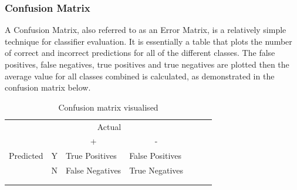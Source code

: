 \documentclass[12pt]{report}
\begin{document}
\subsubsection*{Confusion Matrix}
\begin{flushleft}
A Confusion Matrix, also referred to as an Error Matrix, is a relatively simple technique for classifier evaluation. It is essentially a table that plots the number of correct and incorrect predictions for all of the different classes. The false positives, false negatives, true positives and true negatives are plotted then the average value for all classes combined is calculated, as demonstrated in the confusion matrix below.

\begin{table}[ht!]
\begin{tabular}{lllllll}
          &                        & \multicolumn{1}{r}{Actual}           &                                      &  &  &  \\
          &                        & \multicolumn{1}{c}{+}                & \multicolumn{1}{c}{-}                &  &  &  \\ \cline{3-4}
Predicted & \multicolumn{1}{l|}{Y} & \multicolumn{1}{l|}{True Positives}  & \multicolumn{1}{l|}{False Positives} &  &  &  \\ \cline{3-4}
          & \multicolumn{1}{l|}{N} & \multicolumn{1}{l|}{False Negatives} & \multicolumn{1}{l|}{True Negatives}  &  &  &  \\ \cline{3-4}
          &                        &                                      &                                      &  &  &  \\
          &                        &                                      &                                      &  &  & 
\end{tabular}
\caption{Confusion matrix visualised}
\end{table}
\end{flushleft}
\end{document}
